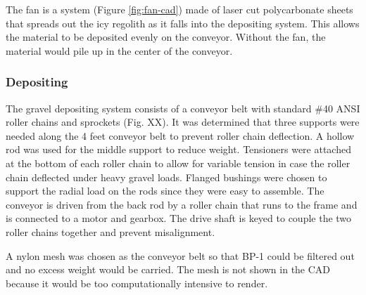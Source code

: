 \documentclass[class=article, crop=false]{standalone}
\begin{document}
	The fan is a system (Figure \ref{fig:fan-cad}) made of laser cut polycarbonate sheets that spreads out the icy regolith as it falls into the depositing system. This allows the material to be deposited evenly on the conveyor. Without the fan, the material would pile up in the center of the conveyor. 
	
	
	\subsubsection{Depositing}
	
	The gravel depositing system consists of a conveyor belt with standard \#40 ANSI roller chains and sprockets (Fig. XX). It was determined that three supports were needed along the 4 feet conveyor belt to prevent roller chain deflection. A hollow rod was used for the middle support to reduce weight. Tensioners were attached at the bottom of each roller chain to allow for variable tension in case the roller chain deflected under heavy gravel loads. Flanged bushings were chosen to support the radial load on the rods since they were easy to assemble. The conveyor is driven from the back rod by a roller chain that runs to the frame and is connected to a motor and gearbox. The drive shaft is keyed to couple the two roller chains together and prevent misalignment. 
	
	A nylon mesh was chosen as the conveyor belt so that BP-1 could be filtered out and no excess weight would be carried. The mesh is not shown in the CAD because it would be too computationally intensive to render.




	
	
	


	
\end{document}

